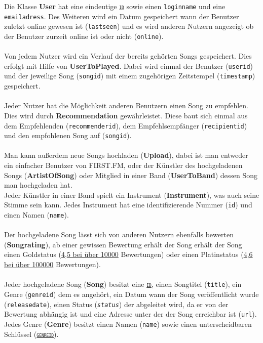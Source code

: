 \documentclass[11pt,a4paper,DIV=9]{scrartcl}
\newcounter{temp}
\begin{document}
Die Klasse \textbf{User} hat eine eindeutige \texttt{\textsc{\underline{id}}} sowie einen \texttt{loginname} und eine \texttt{emailadress}. Des Weiteren wird ein Datum gespeichert wann der Benutzer zuletzt online gewesen ist (\texttt{lastseen}) und es wird anderen Nutzern angezeigt ob der Benutzer zurzeit online ist oder nicht (\texttt{online}).
\\\\
Von jedem Nutzer wird ein Verlauf der bereits geh\"orten Songs gespeichert. Dies erfolgt mit Hilfe von \textbf{UserToPlayed}. Dabei wird einmal der Benutzer (\texttt{userid}) und der jeweilige Song (\texttt{songid}) mit einem zugeh\"origen Zeitstempel (\texttt{timestamp}) gespeichert.
\\\\
Jeder Nutzer hat die M\"oglichkeit anderen Benutzern einen Song zu empfehlen. Dies wird durch \textbf{Recommendation} gew\"ahrleistet. Diese baut sich einmal aus dem Empfehlenden (\texttt{recommenderid}), dem Empfehlsempf\"anger (\texttt{recipientid}) und den empfohlenen Song auf (\texttt{songid}). 
\\\\
Man kann au{\ss}erdem neue Songs hochladen (\textbf{Upload}), dabei ist man entweder ein einfacher Benutzer von FIRST.FM, oder der K\"unstler des hochgeladenen Songs (\textbf{ArtistOfSong}) oder Mitglied in einer Band (\textbf{UserToBand}) dessen Song man hochgeladen hat. \\ Jeder K\"unstler in einer Band spielt ein Instrument (\textbf{Instrument}), was auch seine Stimme sein kann. Jedes Instrument hat eine identifizierende Nummer (\texttt{id}) und einen Namen (\texttt{name}).
\\\\
Der hochgeladene Song l\"asst sich von anderen Nutzern ebenfalls bewerten (\textbf{Songrating}), ab einer gewissen Bewertung erh\"alt der Song erh\"alt der Song einen Goldstatus (\underline{4,5 bei \"uber 10000} Bewertungen) oder einen Platinstatus (\underline{4,6 bei \"uber 100000} Bewertungen).
\\\\
Jeder hochgeladene Song (\textbf{Song}) besitzt eine \texttt{\textsc{\underline{id}}}, einen Songtitel (\texttt{title}), ein Genre (\texttt{genreid}) dem es angeh\"ort, ein Datum wann der Song ver\"offentlicht wurde (\texttt{releasedate}), einen Status (\texttt{\textit{status}}) der abgeleitet wird, da er von der Bewertung abh\"angig ist und eine Adresse unter der der Song erreichbar ist (\texttt{url}). Jedes Genre (\textbf{Genre}) besitzt einen Namen (\texttt{name}) sowie einen unterscheidbaren Schl\"ussel (\texttt{\textsc{\underline{genreid}}}). 
\end{document}

